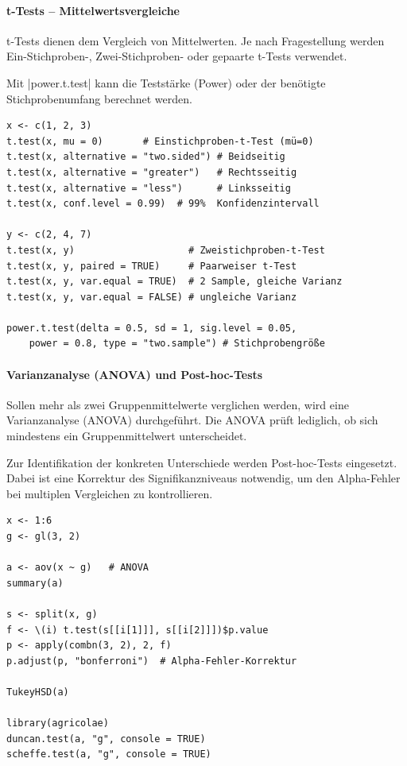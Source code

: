 \documentclass[10pt,twocolumn]{scrartcl}
\renewcommand{\lstinline}{\mycoloredinline}
\begin{document}
\paragraph{t-Tests -- Mittelwertsvergleiche}

t-Tests dienen dem Vergleich von Mittelwerten. Je nach Fragestellung werden Ein-Stichproben-, Zwei-Stichproben- oder gepaarte t-Tests verwendet.

Mit \lstinline|power.t.test| kann die Teststärke (Power) oder der benötigte Stichprobenumfang berechnet werden.

\begin{lstlisting}
x <- c(1, 2, 3)
t.test(x, mu = 0)       # Einstichproben-t-Test (mü=0)
t.test(x, alternative = "two.sided") # Beidseitig
t.test(x, alternative = "greater")   # Rechtsseitig
t.test(x, alternative = "less")      # Linksseitig
t.test(x, conf.level = 0.99)  # 99%  Konfidenzintervall

y <- c(2, 4, 7)
t.test(x, y)                    # Zweistichproben-t-Test
t.test(x, y, paired = TRUE)     # Paarweiser t-Test
t.test(x, y, var.equal = TRUE)  # 2 Sample, gleiche Varianz
t.test(x, y, var.equal = FALSE) # ungleiche Varianz

power.t.test(delta = 0.5, sd = 1, sig.level = 0.05,
    power = 0.8, type = "two.sample") # Stichprobengröße
\end{lstlisting}

\paragraph{Varianzanalyse (ANOVA) und Post-hoc-Tests}

Sollen mehr als zwei Gruppenmittelwerte verglichen werden, wird eine Varianzanalyse (ANOVA) durchgeführt. Die ANOVA prüft lediglich, ob sich mindestens ein Gruppenmittelwert unterscheidet.

Zur Identifikation der konkreten Unterschiede werden Post-hoc-Tests eingesetzt. Dabei ist eine Korrektur des Signifikanzniveaus notwendig, um den Alpha-Fehler bei multiplen Vergleichen zu kontrollieren.

\begin{lstlisting}
x <- 1:6
g <- gl(3, 2)

a <- aov(x ~ g)   # ANOVA
summary(a)

s <- split(x, g)
f <- \(i) t.test(s[[i[1]]], s[[i[2]]])$p.value
p <- apply(combn(3, 2), 2, f)
p.adjust(p, "bonferroni")  # Alpha-Fehler-Korrektur

TukeyHSD(a)

library(agricolae)
duncan.test(a, "g", console = TRUE)
scheffe.test(a, "g", console = TRUE)
\end{lstlisting}
\end{document}
